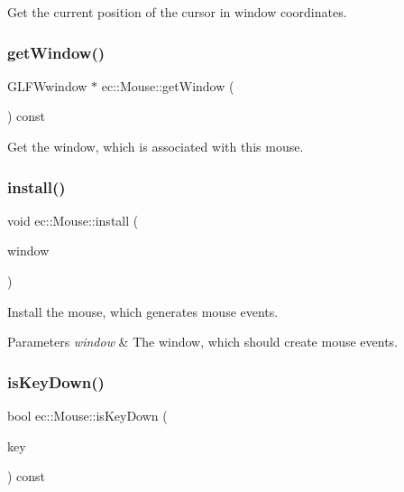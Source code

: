 Get the current position of the cursor in window coordinates. 

\mbox{\label{classec_1_1_mouse_a7daf494a5600c6ffa5278e201b68963f}} 
\subsubsection{\texorpdfstring{get\+Window()}{getWindow()}}
{\footnotesize\ttfamily G\+L\+F\+Wwindow $\ast$ ec\+::\+Mouse\+::get\+Window (\begin{DoxyParamCaption}{ }\end{DoxyParamCaption}) const}



Get the window, which is associated with this mouse. 

\mbox{\label{classec_1_1_mouse_a7e679de43ed15a8366d15ebf641c7b97}} 
\subsubsection{\texorpdfstring{install()}{install()}}
{\footnotesize\ttfamily void ec\+::\+Mouse\+::install (\begin{DoxyParamCaption}\item[{\mbox{\hyperlink{classec_1_1_window}{Window}} $\ast$}]{window }\end{DoxyParamCaption})}



Install the mouse, which generates mouse events. 


\begin{DoxyParams}{Parameters}
{\em window} & The window, which should create mouse events. \\
\hline
\end{DoxyParams}
\mbox{\label{classec_1_1_mouse_a3d5fd51a99aae2800604ecc5cb01ae21}} 
\subsubsection{\texorpdfstring{is\+Key\+Down()}{isKeyDown()}}
{\footnotesize\ttfamily bool ec\+::\+Mouse\+::is\+Key\+Down (\begin{DoxyParamCaption}\item[{\mbox{\hyperlink{classec_1_1_mouse_acabdd3509adc381e415c60b29554e2fb}{Mouse\+::\+E\+C\+\_\+\+K\+E\+Y\+\_\+\+M\+O\+U\+SE}}}]{key }\end{DoxyParamCaption}) const}



